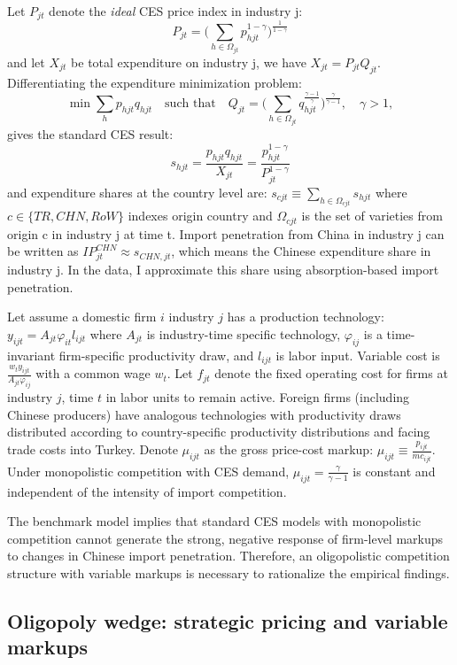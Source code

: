 \documentclass[12pt]{article}
\begin{document}
Let $P_{jt}$ denote the \textit{ideal} CES price index in industry j: $$P_{jt} = \Bigg( \sum_{h \in \Omega_{jt}} p_{hjt}^{1-\gamma} \Bigg)^{\frac{1}{1-\gamma}}$$ and let $X_{jt}$ be total expenditure on industry j, we have $X_{jt}=P_{jt}Q_{jt}$. Differentiating the expenditure minimization problem: 
\[
\min \sum_h p_{hjt}q_{hjt} \quad \text{such that} \quad Q_{jt} = \Bigg( \sum_{h \in \Omega_{jt}} q_{hjt}^{\frac{\gamma-1}{\gamma}} \Bigg)^{\frac{\gamma}{\gamma-1}}, \quad \gamma>1,
\]
gives the standard CES result: $$s_{hjt} = \frac{p_{hjt}q_{hjt}}{X_{jt}}= \frac{p_{hjt}^{1-\gamma}}{P_{jt}^{1-\gamma}}$$and expenditure shares at the country level are: $s_{cjt} \equiv \sum_{h \in \Omega_{cjt}}s_{hjt}$ where $c \in \{TR, CHN, RoW \}$ indexes origin country and $\Omega_{cjt}$ is the set of varieties from origin c in industry j at time t. Import penetration from China in industry j can be written as $IP^{CHN}_{jt} \approx s_{CHN,jt}$, which means the Chinese expenditure share in industry j. In the data, I approximate this share using absorption-based import penetration.

Let assume a domestic firm $i$ industry $j$ has a production technology: $y_{ijt}= A_{jt}\varphi_{it}l_{ijt}$ where $A_{jt}$ is industry-time specific technology, $\varphi_{ij}$ is a time-invariant firm-specific productivity draw, and $l_{ijt}$ is labor input. Variable cost is $\frac{w_ty_{ijt}}{A_{jt}\varphi_{ij}}$ with a common wage $w_t$. Let $f_{jt}$ denote the fixed operating cost for firms at industry $j$, time $t$ in labor units to remain active. Foreign firms (including Chinese producers) have analogous technologies with productivity draws distributed according to country-specific productivity distributions and facing trade costs into Turkey. Denote $\mu_{ijt}$ as the gross price-cost markup: $\mu_{ijt} \equiv \frac{p_{ijt}}{mc_{ijt}}$. Under monopolistic competition with CES demand, $\mu_{ijt} = \frac{\gamma}{\gamma-1}$ is constant and independent of the intensity of import competition. 

The benchmark model implies that standard CES models with monopolistic competition cannot generate the strong, negative response of firm-level markups to changes in Chinese import penetration. Therefore, an oligopolistic competition structure with variable markups is necessary to rationalize the empirical findings. 

\subsection{Oligopoly wedge: strategic pricing and variable markups}
\end{document}
